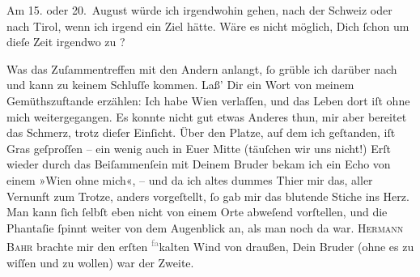 \pstart
           Am 15. oder 20. August
               würde ich irgendwohin gehen, nach der Schweiz
               oder nach Tirol, wenn ich irgend ein Ziel
               hätte. Wäre es nicht möglich, Dich ſchon um dieſe Zeit irgendwo zu \label{K_L02608-3v}\label{K_L02608-3}?\pend
           
\pstart
           Was das Zuſammentreffen mit den Andern anlangt, ſo grüble ich darüber nach und kann
               zu keinem Schluſſe kommen. Laß’ Dir ein Wort von meinem Gemüthszuftande erzählen: Ich
               habe Wien verlaſſen, und das Leben dort iſt ohne
               mich weitergegangen. Es konnte nicht gut \strikeout{\textcolor{gray}{e}} etwas Anderes {\pb}thun, mir aber bereitet das
               Schmerz, trotz dieſer Einſicht. Über den Platze, auf dem ich geſtanden, iſt Gras
               geſproſſen – ein wenig auch in Euer Mitte (täuſchen wir uns nicht!) Erſt wieder durch
               das Beiſammenſein mit Deinem Bruder bekam ich ein Echo von einem »Wien
               ohne mich«, – und da ich altes dummes Thier mir das, aller Vernunft zum Trotze,
               anders vorgeſtellt, ſo  gab mir das blutende Stiche ins Herz. Man kann {\pb}ſich ſelbſt eben nicht von einem Orte abweſend
               vorſtellen, und die Phantaſie ſpinnt weiter von dem Augenblick an, als man noch da
               war. \textsc{Hermann Bahr} brachte mir den erſten \substVorne{}\textsuperscript{\textcolor{gray}{fa}}\substDazwischen{}ka\substHinten{}lten Wind von draußen, Dein Bruder (ohne es zu wiſſen und zu wollen) war der Zweite.
